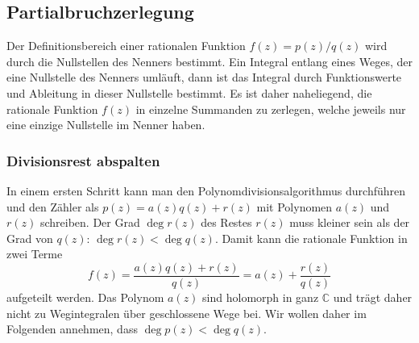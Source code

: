 %
%
%
\subsection{Partialbruchzerlegung
\label{buch:analytisch:rational:subsection:partialbruch}}
Der Definitionsbereich einer rationalen Funktion $f(z)=p(z)/q(z)$
wird durch die Nullstellen des Nenners bestimmt.
Ein Integral entlang eines Weges, der eine Nullstelle des Nenners
umläuft, dann ist das Integral durch Funktionswerte und 
Ableitung in dieser Nullstelle bestimmt.
Es ist daher naheliegend, die rationale Funktion $f(z)$ in
einzelne Summanden zu zerlegen, welche jeweils nur eine einzige
Nullstelle im Nenner haben.

%
%
\subsubsection{Divisionsrest abspalten}
In einem ersten Schritt kann man den Polynomdivisionsalgorithmus
durchführen und den Zähler als $p(z) = a(z)q(z) + r(z)$ mit
Polynomen $a(z)$ und $r(z)$ schreiben.
%
Der Grad $\deg r(z)$ des Restes $r(z)$ muss kleiner sein als
der Grad von $q(z)$: $\deg r(z) <\deg q(z)$.
Damit kann die rationale Funktion in zwei Terme
\[
f(z)
=
\frac{a(z)q(z)+r(z)}{q(z)}
=
a(z)
+
\frac{r(z)}{q(z)}
\]
aufgeteilt werden.
Das Polynom $a(z)$ sind holomorph in ganz $\mathbb{C}$ und trägt
daher nicht zu Wegintegralen über geschlossene Wege bei.
Wir wollen daher im Folgenden annehmen, dass $\deg p(z)<\deg q(z)$.

%
%
